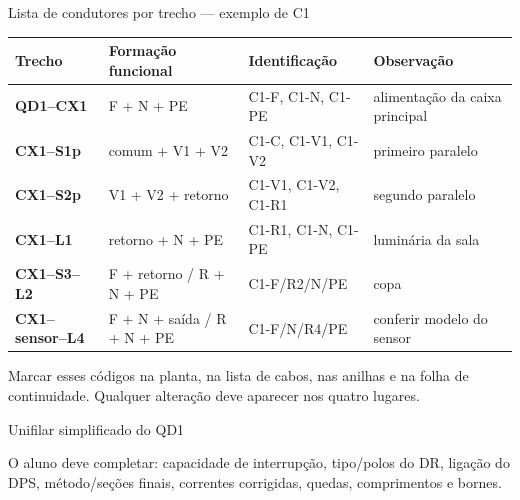 \begin{frame}{Lista de condutores por trecho — exemplo de C1}
\scriptsize
\begin{tabularx}{\textwidth}{>{\bfseries}p{2.3cm}p{2.6cm}X X}
\toprule
Trecho & Formação funcional & Identificação & Observação \\
\midrule
QD1--CX1 & F + N + PE & C1-F, C1-N, C1-PE & alimentação da caixa principal \\
CX1--S1p & comum + V1 + V2 & C1-C, C1-V1, C1-V2 & primeiro paralelo \\
CX1--S2p & V1 + V2 + retorno & C1-V1, C1-V2, C1-R1 & segundo paralelo \\
CX1--L1 & retorno + N + PE & C1-R1, C1-N, C1-PE & luminária da sala \\
CX1--S3--L2 & F + retorno / R + N + PE & C1-F/R2/N/PE & copa \\
CX1--sensor--L4 & F + N + saída / R + N + PE & C1-F/N/R4/PE & conferir modelo do sensor \\
\bottomrule
\end{tabularx}
\begin{caixaProjeto}[title=Atividade]
Marcar esses códigos na planta, na lista de cabos, nas anilhas e na folha de continuidade. Qualquer alteração deve aparecer nos quatro lugares.
\end{caixaProjeto}
\end{frame}

\begin{frame}{Unifilar simplificado do QD1}
\centering
{}
\begin{caixaObs}
O aluno deve completar: capacidade de interrupção, tipo/polos do DR, ligação do DPS, método/seções finais, correntes corrigidas, quedas, comprimentos e bornes.
\end{caixaObs}
\end{frame}

